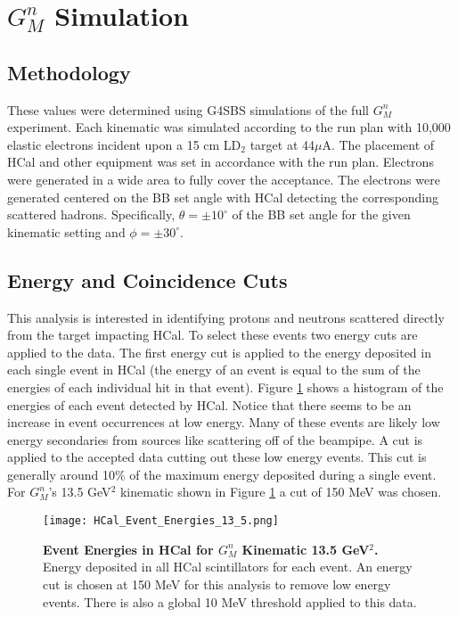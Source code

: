 \documentclass[10pt]{article}
\begin{document}
\section{$G_M^n$ Simulation}
\subsection{Methodology}

These values were determined using G4SBS simulations of the full $G_M^n$ experiment. Each kinematic was simulated according to the run plan with 10,000 elastic electrons incident upon a 15 cm LD$_2$ target at 44$\mu$A. The placement of HCal and other equipment was set in accordance with the run plan. Electrons were generated in a wide area to fully cover the acceptance. The electrons were generated centered on the BB set angle with HCal detecting the corresponding scattered hadrons. Specifically, $\theta = \pm10^{\circ}$ of the BB set angle for the given kinematic setting and $\phi = \pm30^{\circ}$.\\

\subsection{Energy and Coincidence Cuts}
\label{ssec:cuts}

This analysis is interested in identifying protons and neutrons scattered directly from the target impacting HCal. To select these events two energy cuts are applied to the data. The first energy cut is applied to the energy deposited in each single event in HCal (the energy of an event is equal to the sum of the energies of each individual hit in that event). Figure \ref{fig:hcal_evt_eng} shows a histogram of the energies of each event detected by HCal. Notice that there seems to be an increase in event occurrences at low energy. Many of these events are likely low energy secondaries from sources like scattering off of the beampipe. A cut is applied to the accepted data cutting out these low energy events. This cut is generally around 10\% of the maximum energy deposited during a single event. For $G_M^n$'s 13.5 GeV$^2$ kinematic shown in Figure \ref{fig:hcal_evt_eng} a cut of 150 MeV was chosen. \\

	\begin{figure}[!ht]
	\begin{center}
	\texttt{[image: HCal\_Event\_Energies\_13\_5.png]}
	\end{center}
	\caption{
	{\bf{Event Energies in HCal for $G_M^n$ Kinematic 13.5 GeV$^2$.}} Energy deposited in all HCal scintillators for each event. An energy cut is chosen at 150 MeV for this analysis to remove low energy events. There is also a global 10 MeV threshold applied to this data.}
	\label{fig:hcal_evt_eng}
	\end{figure}	
	
\end{document}
